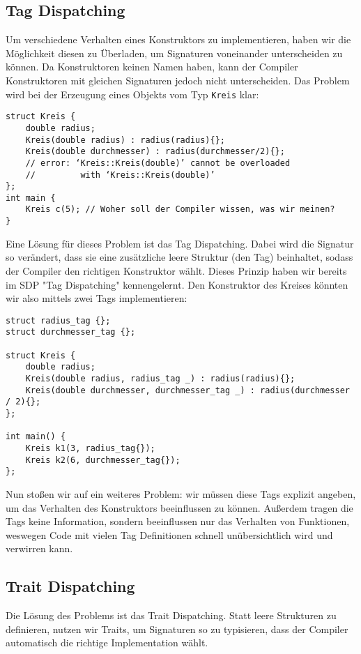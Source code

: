 \documentclass{article}
\begin{document}
\subsection*{Tag Dispatching}
Um verschiedene Verhalten eines Konstruktors zu implementieren, haben wir die Möglichkeit diesen zu Überladen, um Signaturen voneinander unterscheiden zu können. Da Konstruktoren keinen Namen haben, kann der Compiler Konstruktoren mit gleichen Signaturen jedoch nicht unterscheiden.
Das Problem wird bei der Erzeugung eines Objekts vom Typ \verb"Kreis" klar:
\begin{verbatim}
struct Kreis {
    double radius;
    Kreis(double radius) : radius(radius){};
    Kreis(double durchmesser) : radius(durchmesser/2){};  
    // error: ‘Kreis::Kreis(double)’ cannot be overloaded 
    //         with ‘Kreis::Kreis(double)’
};
int main {
    Kreis c(5); // Woher soll der Compiler wissen, was wir meinen?
}
\end{verbatim}
Eine Lösung für dieses Problem ist das Tag Dispatching. Dabei wird die Signatur so verändert, dass sie eine zusätzliche leere Struktur (den Tag) beinhaltet, sodass der Compiler den richtigen Konstruktor wählt. Dieses Prinzip haben wir bereits im SDP "Tag Dispatching" kennengelernt. Den Konstruktor des Kreises könnten wir also mittels zwei Tags implementieren:
\begin{verbatim}
struct radius_tag {};
struct durchmesser_tag {};

struct Kreis {
    double radius;
    Kreis(double radius, radius_tag _) : radius(radius){};
    Kreis(double durchmesser, durchmesser_tag _) : radius(durchmesser / 2){};
};

int main() {
    Kreis k1(3, radius_tag{});
    Kreis k2(6, durchmesser_tag{});
};
\end{verbatim}
Nun stoßen wir auf ein weiteres Problem: wir müssen diese Tags explizit angeben, um das Verhalten des Konstruktors beeinflussen zu können. Außerdem tragen die Tags keine Information, sondern beeinflussen nur das Verhalten von Funktionen, weswegen Code mit vielen Tag Definitionen schnell unübersichtlich wird und verwirren kann.

\subsection*{Trait Dispatching}
Die Lösung des Problems ist das Trait Dispatching. Statt leere Strukturen zu definieren, nutzen wir Traits, um Signaturen so zu typisieren, dass der Compiler automatisch die richtige Implementation wählt.
\end{document}
